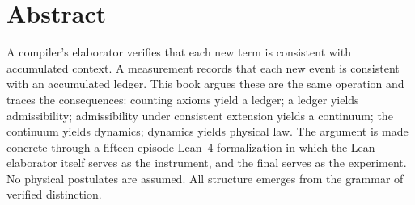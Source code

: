 \chapter*{Abstract}
\label{chap:abstract}

A compiler's elaborator verifies that each new term is consistent with
accumulated context. A measurement records that each new event is consistent
with an accumulated ledger. This book argues these are the same operation and
traces the consequences: counting axioms yield a ledger; a ledger yields
admissibility; admissibility under consistent extension yields a continuum;
the continuum yields dynamics; dynamics yields physical law. The argument is
made concrete through a fifteen-episode Lean~4 formalization in which the
Lean elaborator itself serves as the instrument, and the final 
serves as the experiment. No physical postulates are assumed. All structure
emerges from the grammar of verified distinction.


